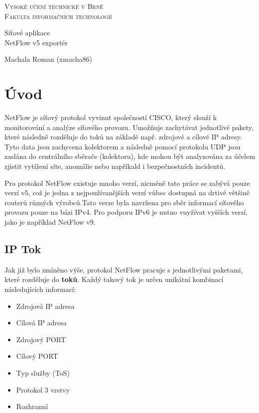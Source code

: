 \documentclass[11pt, a4paper, hidelinks]{article}[08.10.2023]
\begin{document}
\begin{titlepage}
    \begin{center}
        
        {\Huge \textsc{Vysoké učení technické v Brně}\\[0.5em]}
        {\huge \textsc{Fakulta informačních technologií}}
    
        {\LARGE Síťové aplikace\\[0.4em]
        NetFlow v5 exportér}
    
        {\Large \hfill {Machala Roman (xmacha86)}}
    \end{center}

\end{titlepage}

\tableofcontents
\pagebreak

\section{Úvod}
    NetFlow je síťový protokol vyvinut společností CISCO, který slouží k monitorování a analýze síťového provozu.
    Umožňuje zachytávat jednotlivé pakety, které následně rozděluje do toků na základě např. zdrojové a cílové IP adresy.
    Tyto data jsou zachycena kolektorem a následně pomocí protokolu UDP jsou zaslána do centrálního sběrače (kolektoru), kde
    mohou být analyzována za účelem zjistit vytížení síte, anomálie nebo napříkald i bezpečnostních incidentů\cite{Cisco_2019}.

    Pro protokol NetFlow existuje mnoho verzí, nicméně tato práce se 
    zabývá pouze verzí v5, což je jedna z nejpoužívanějších verzí vůbec dostupná na drtivé většině
    routerů různých výrobců.Tato verze byla navržena pro sběr informací síťového
    provozu pouze na bázi IPv4. Pro podporu IPv6 je nutno vuyžívat vyšších verzí, jako je například NetFlow v9\cite{ManageEngine}.

\subsection{IP Tok}
    Jak již bylo zmíněno výše, protokol NetFlow pracuje s jednotlivými paketami, které rozděluje do \textbf{toků}.
    Každý takový tok je určen unikátní kombinací následujících informací:
    \begin{itemize}
        \item{Zdrojová IP adresa}
        \item{Cílová IP adresa}
        \item{Zdrojový PORT}
        \item{Cílový PORT}
        \item{Typ služby (ToS)}
        \item{Protokol 3 vrstvy}
        \item{Rozhranní}
    \end{itemize}
\end{document}
